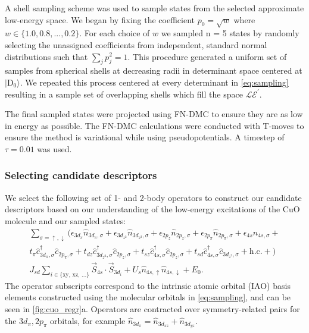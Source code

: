 \documentclass[12pt]{article}
\begin{document}
A shell sampling scheme was used to sample states from the selected approximate low-energy space.
We began by fixing the coefficient $p_0 = \sqrt{w}$ where $w \in \{1.0, 0.8, ..., 0.2\}$. 
For each choice of $w$ we sampled n = 5 states by randomly selecting the unassigned coefficients from independent, standard normal distributions such that $\sum_j p_j^2 = 1$. 
This procedure generated a uniform set of samples from spherical shells at decreasing radii in determinant space centered at $|\text{D}_0\rangle$.
We repeated this process centered at every determinant in \eqref{eq:sampling} resulting in a sample set of overlapping shells which fill the space $\mathcal{LE}^\prime$.

The final sampled states were projected using FN-DMC to ensure they are as low in energy as possible.
The FN-DMC calculations were conducted with T-moves to ensure the method is variational while using pseudopotentials.
A timestep of $\tau = 0.01$ was used.

\subsubsection{Selecting candidate descriptors}
We select the following set of 1- and 2-body operators to construct our candidate descriptors based on our understanding of the low-energy excitations of the CuO molecule and our sampled states:
\begin{equation}
\begin{split}
\sum_{\sigma = \uparrow, \downarrow} \Bigg(\epsilon_{3d_\pi}\hat{n}_{3d_\pi,\sigma} + \epsilon_{3d_{z^2}}\hat{n}_{3d_{z^2},\sigma} +  \epsilon_{2p_z} \hat{n}_{2p_z,\sigma} + \epsilon_{2p_\pi}\hat{n}_{2p_\pi,\sigma} + \epsilon_{4s}\hat{n}_{4s,\sigma} +\\
t_\pi \hat{c}_{3d_\pi,\sigma}^\dagger \hat{c}_{2p_\pi,\sigma} + t_{dz} \hat{c}_{3d_{z^2},\sigma}^\dagger \hat{c}_{2p_z,\sigma}  + t_{sz}\hat{c}_{4s,\sigma}^\dagger \hat{c}_{2p_z,\sigma} + t_{sd}\hat{c}_{4s,\sigma}^\dagger \hat{c}_{3d_{z^2},\sigma} + \text{h.c.} + \Bigg)  \\
J_{sd}\sum_{i\in {\{\text{xy, xz, ...}}\}} \vec{S}_{4s} \cdot \vec{S}_{3d_i} + U_s \hat{n}_{4s,\uparrow}\hat{n}_{4s,\downarrow} + E_0.
\end{split}
\label{eq:models}
\end{equation}
The operator subscripts correspond to the intrinsic atomic orbital (IAO) basis elements constructed using the molecular orbitals in \eqref{eq:sampling}, and can be seen in \ref{fig:cuo_regr}a.
Operators are contracted over symmetry-related pairs for the $3d_\pi, 2p_\pi$ orbitals, for example $\hat{n}_{3d_\pi} = \hat{n}_{3d_{xz}} + \hat{n}_{3d_{yz}}$.
\end{document}

